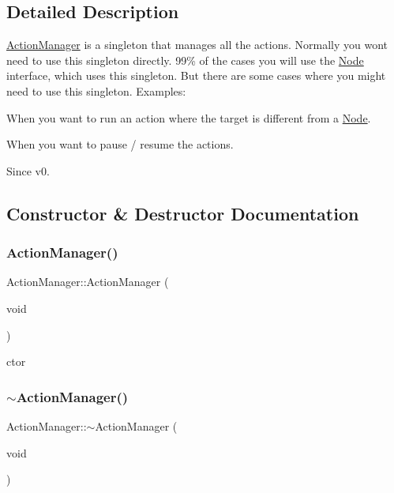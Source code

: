 \subsection{Detailed Description}
\hyperlink{classActionManager}{Action\+Manager} is a singleton that manages all the actions. Normally you won\textquotesingle{}t need to use this singleton directly. 99\% of the cases you will use the \hyperlink{classNode}{Node} interface, which uses this singleton. But there are some cases where you might need to use this singleton. Examples\+: 


\begin{DoxyItemize}
\item When you want to run an action where the target is different from a \hyperlink{classNode}{Node}.
\item When you want to pause / resume the actions.
\end{DoxyItemize}

\begin{DoxySince}{Since}
v0. 
\end{DoxySince}


\subsection{Constructor \& Destructor Documentation}
\mbox{\label{classActionManager_a3c3e47b867da96699e32647b847b9df5}} 
\subsubsection{\texorpdfstring{Action\+Manager()}{ActionManager()}\hspace{0.1cm}{\footnotesize\ttfamily [1/2]}}
{\footnotesize\ttfamily Action\+Manager\+::\+Action\+Manager (\begin{DoxyParamCaption}\item[{void}]{ }\end{DoxyParamCaption})}

ctor \mbox{\label{classActionManager_aa9a417d77050aa7f351df4996cf727e3}} 
\subsubsection{\texorpdfstring{$\sim$\+Action\+Manager()}{~ActionManager()}\hspace{0.1cm}{\footnotesize\ttfamily [1/2]}}
{\footnotesize\ttfamily Action\+Manager\+::$\sim$\+Action\+Manager (\begin{DoxyParamCaption}\item[{void}]{ }\end{DoxyParamCaption})}

